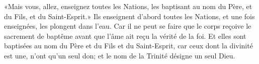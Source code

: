 «Mais vous, allez, enseignez toutes les Nations,
	les baptisant au nom du Père, et du Fils, et du Saint-Esprit.»
Ils enseignent d’abord toutes les Nations,
	et une fois enseignées, les plongent dans l’eau.
Car il ne peut se faire que le corps reçoive le sacrement de baptême
	avant que l’âme ait reçu la vérité de la foi.
Et elles sont baptisées au nom du Père et du Fils et du Saint-Esprit,
	car ceux dont la divinité est une, n’ont qu’un seul don;
	et le nom de la Trinité désigne un seul Dieu.
